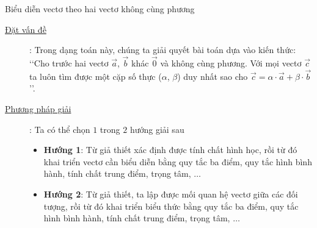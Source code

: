 	\begin{dang}{Biểu diễn vectơ theo hai vectơ không cùng phương}%
	\begin{description}
		\item[\underline{Đặt vấn đề}]: Trong dạng toán này, chúng ta giải quyết bài toán dựa vào kiến thức: \lq\lq  Cho trước hai vectơ $\overrightarrow{a}$, $\overrightarrow{b}$ khác $\overrightarrow{0}$ và không cùng phương. Với mọi vectơ $\overrightarrow{c}$ ta luôn tìm được một cặp số thực ($\alpha$, $\beta$) duy nhất sao cho $\overrightarrow{c}=\alpha\cdot \overrightarrow{a}+\beta\cdot \overrightarrow{b}$\rq\rq.
		\item[\underline{Phương pháp giải}]: Ta có thể chọn $1$ trong $2$ hướng giải sau
		\begin{itemize}
			\item \textbf{Hướng 1}: Từ giả thiết xác định được tính chất hình học, rồi từ đó khai triển vectơ cần biểu diễn bằng quy tắc ba điểm, quy tắc hình bình hành, tính chất trung điểm, trọng tâm, $\ldots$
			\item \textbf{Hướng 2}: Từ giả thiết, ta lập được mối quan hệ vectơ giữa các đối tượng, rồi từ đó khai triển biểu thức bằng quy tắc ba điểm, quy tắc hình bình hành, tính chất trung điểm, trọng tâm, $\ldots$
		\end{itemize}
	\end{description}
\end{dang}
